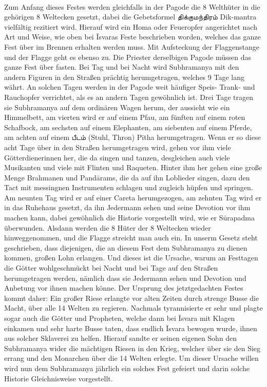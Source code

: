 \documentclass{article}
\newcommand{\TamilText}[1]{\texttamil{#1}}
\newcommand{\tam}[1]{\TamilText{#1}}
\begin{document}
\paragraph{}
Zum Anfang dieses Festes werden gleichfalls in der Pagode die 8 Welthüter in die gehörigen 8 Weltecken gesetzt, dabei die Gebetsformel \tam{திக்குமந்திரம்} Dik-mantra vielfältig rezitiert wird. Hierauf wird ein Homa oder Feueropfer angerichtet nach Art und Weise, wie oben bei \={I}svaras Feste beschrieben worden, welches das ganze Fest über im Brennen erhalten werden muss. Mit Aufsteckung der Flaggenstange und der Flagge geht es ebenso zu. Die Priester derselbigen Pagode müssen das ganze Fest über fasten. Bei Tag und bei Nacht wird Subhramanya mit den andern Figuren in den Straßen prächtig herumgetragen, welches 9 Tage lang währt. An solchen Tagen werden in der Pagode weit häufiger Speis- Trank- und Rauchopfer verrichtet, als es an andern Tagen gewöhnlich ist. Drei Tage tragen sie Subhramanya auf dem ordinären Wagen herum, der aussieht wie ein Himmelbett, am vierten wird er auf einem Pfau, am fünften auf einem roten Schafbock, am sechsten auf einem Elephanten, am siebenten auf einem Pferde, am achten auf einem \tam{பீடம்} (Stuhl, Thron) P\={i}tha herumgetragen. Wenn er so diese acht Tage über in den Straßen herumgetragen wird, gehen vor ihm viele Götterdienerinnen her, die da singen und tanzen, desgleichen auch viele Musikanten und viele mit Flinten und Raqueten. Hinter ihm her gehen eine große Menge Brahmanen und Pand\={a}rams, die da auf ihn Loblieder singen, dazu den Tact mit messingnen Instrumenten schlagen und zugleich hüpfen und springen. Am neunten Tag wird er auf einer Careta herumgezogen, am zehnten Tag wird er in das Ruhehaus gesetzt, da ihn Jedermann sehen und seine Devotion vor ihm machen kann, dabei gewöhnlich die Historie vorgestellt wird, wie er S\={u}rapadma überwunden. Alsdann werden die 8 Hüter der 8 Weltecken wieder hinweggenommen, und die Flagge streicht man auch ein. In unserm Gesetz steht geschrieben, dass diejenigen, die an diesem Fest dem Subhramanya zu dienen kommen, großen Lohn erlangen. Und dieses ist die Ursache, warum an Festtagen die Götter wohlgeschmückt bei Nacht und bei Tage auf den Straßen herumgetragen werden, nämlich dass sie Jedermann sehen und Devotion und Anbetung vor ihnen machen könne. Der Ursprung des jetztgedachten Festes kommt daher: Ein großer Riese erlangte vor alten Zeiten durch strenge Busse die Macht, über alle 14 Welten zu regieren. Nachmals tyrannisierte er sehr und plagte sogar auch die Götter und Propheten, welche dann bei \={I}svara mit Klagen einkamen und sehr harte Busse taten, dass endlich \={I}svara bewogen wurde, ihnen aus solcher Sklaverei zu helfen. Hierauf sandte er seinen eigenen Sohn den Subhramanya wider die mächtigen Riesen in den Krieg, welcher über sie den Sieg errang und den Monarchen über die 14 Welten erlegte. Um dieser Ursache willen wird nun dem Subhramanya jährlich ein solches Fest gefeiert und darin solche Historie Gleichnisweise vorgestellt.
\end{document}
